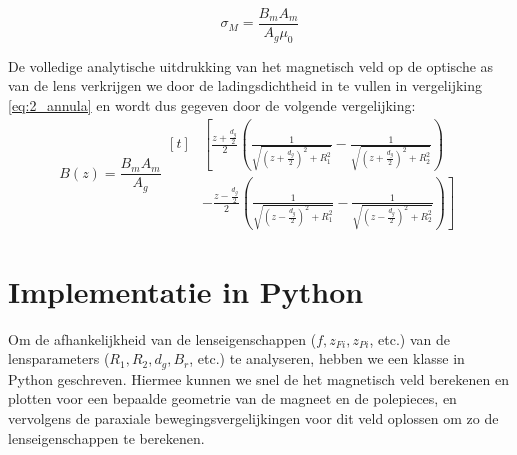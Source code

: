 \documentclass[we,twoside,openright,a4paper,11pt]{uantwerpenbamathesis}
\begin{document}
\begin{equation}\label{eq:charge_density}
    \sigma_M = \frac{B_m A_m}{A_g \mu_0}
\end{equation}

De volledige analytische uitdrukking van het magnetisch veld op de optische as van de lens verkrijgen we door de ladingsdichtheid in te vullen in vergelijking \ref{eq:2_annula} en wordt dus gegeven door de volgende vergelijking:\small
\begin{equation}\label{eq:analytical_B_field_final}
    B(z) = \frac{B_m A_m}{A_g}
    \begin{aligned}[t]
        &\left[ \frac{z+\frac{d_g}{2}}{2}\left(\frac{1}{\sqrt{\left(z+\frac{d_g}{2}\right)^2+R_1^2}}-\frac{1}{\sqrt{\left(z+\frac{d_g}{2}\right)^2+R_2^2}}\right)\right.\\
        &\left.- \frac{z-\frac{d_g}{2}}{2}\left(\frac{1}{\sqrt{\left(z-\frac{d_g}{2}\right)^2+R_1^2}}-\frac{1}{\sqrt{\left(z-\frac{d_g}{2}\right)^2+R_2^2}}\right)\right]
    \end{aligned}
\end{equation}


\section{Implementatie in Python}\label{ch:implementatie}
Om de afhankelijkheid van de lenseigenschappen ($f, z_{Fi}, z_{Pi}$, etc.) van de lensparameters ($R_1, R_2, d_g, B_r$, etc.) te analyseren, hebben we een klasse in Python geschreven. Hiermee kunnen we snel de het magnetisch veld berekenen en plotten voor een bepaalde geometrie van de magneet en de polepieces, en vervolgens de paraxiale bewegingsvergelijkingen voor dit veld oplossen om zo de lenseigenschappen te berekenen. 
\end{document}
